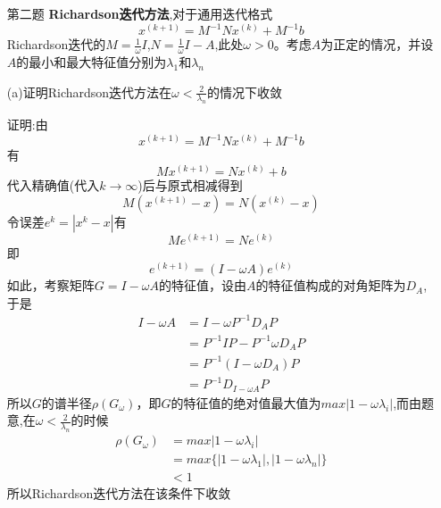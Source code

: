 \documentclass[12pt,a4paper,utf8]{ctexart}
\begin{document}
\begin{enumerate}
\item[第二题] \textbf{Richardson迭代方法},对于通用迭代格式
\begin{equation}
	x^{(k+1)} = M^{-1} Nx^{(k)}+M^{-1}b \nonumber
\end{equation}
Richardson迭代的$ M = \frac{1}{\omega} I$,$ N=\frac{1}{\omega}I - A$,此处$ \omega > 0 $。考虑$ A $为正定的情况，并设$ A $的最小和最大特征值分别为$ \lambda_1 $和$ \lambda_n $

(a)证明Richardson迭代方法在$ \omega < \frac{2}{\lambda_n} $的情况下收敛

证明:由
\begin{equation}
	x^{(k+1)} = M^{-1} Nx^{(k)}+M^{-1}b \nonumber
\end{equation}
有
\begin{equation}
	Mx^{(k+1)} = Nx^{(k)}+b \nonumber
\end{equation}
代入精确值(代入$ k\rightarrow \infty $)后与原式相减得到
\begin{equation}
	M(x^{(k+1)}-x) = N(x^{(k)}-x) \nonumber
\end{equation}
令误差$ e^{k} = |x^{k} - x |$有
\begin{equation}
	Me^{(k+1)} = Ne^{(k)} \nonumber
\end{equation}
即
\begin{equation}
	e^{(k+1)} = (I-\omega A)e^{(k)} \nonumber
\end{equation}
如此，考察矩阵$ G = I - \omega A $的特征值，设由$ A $的特征值构成的对角矩阵为$ D_A $,于是
\begin{equation}
	\begin{aligned}
		I - \omega A &= I - \omega P^{-1}D_AP \\
					&= P^{-1}IP - P^{-1}\omega D_AP \\
					&= P^{-1} (I - \omega D_A)P \\
					&= P^{-1} D_{I-\omega A} P
	\end{aligned}
	\nonumber
\end{equation}
所以$ G $的谱半径$ \rho(G_{\omega }) $，即$ G $的特征值的绝对值最大值为$ max|1-\omega \lambda_i| $,而由题意,在$ \omega < \frac{2}{\lambda_n} $的时候
\begin{equation}
	\begin{aligned}
		\rho(G_{\omega }) & = max|1-\omega \lambda_i| \\
						& = max\{|1-\omega \lambda_1| , |1-\omega \lambda_n| \} \\
						& < 1
	\end{aligned}
	\nonumber
\end{equation}
所以Richardson迭代方法在该条件下收敛


\end{enumerate}
\end{document}
